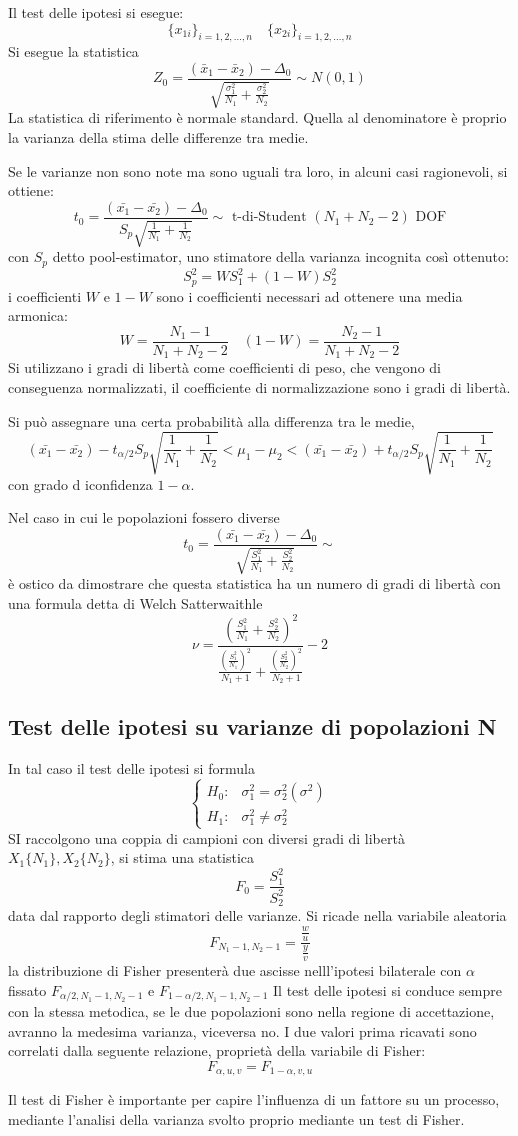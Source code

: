 Il test delle ipotesi si esegue:
$$
\{x_{1i}\}_{i=1,2,\ldots, n} \quad \{x_{2i}\}_{i=1,2,\ldots,n} 
$$
Si esegue la statistica
$$
Z_0 = \frac{(\bar{x}_1 - \bar{x}_2) -\Delta_0}{\sqrt{\frac{\sigma^2_1}{N_1}+\frac{\sigma_2^2}{N_2}}} \sim N(0,1)
$$
La statistica di riferimento è normale standard. Quella al denominatore è proprio la varianza della stima delle differenze tra medie.

Se le varianze non sono note ma sono uguali tra loro, in alcuni casi ragionevoli, si ottiene:
$$
t_0 = \frac{(\bar{x_1}-\bar{x_2})-\Delta_0}{S_p \sqrt{\frac{1}{N_1}+\frac{1}{N_2}}} \sim \text{ t-di-Student } (N_1+N_2-2) \text{ DOF}
$$
con $S_p$ detto pool-estimator, uno stimatore della varianza incognita così ottenuto:
$$
S_p^2 = WS_1^2 + (1-W)S_2^2
$$
i coefficienti $W$ e $1-W$ sono i coefficienti necessari ad ottenere una media armonica:
$$
W = \frac{N_1-1}{N_1+N_2-2} \quad (1-W) = \frac{N_2-1}{N_1+N_2-2}
$$
Si utilizzano i gradi di libertà come coefficienti di peso, che vengono di 
conseguenza normalizzati, il coefficiente di normalizzazione sono i gradi di 
libertà.

Si può assegnare una certa probabilità alla differenza tra le medie,
$$
(\bar{x_1}-\bar{x_2}) - t_{\alpha/2}S_p\sqrt{\frac{1}{N_1}+\frac{1}{N_2}} <
\mu_1-\mu_2 < (\bar{x_1}-\bar{x_2}) + t_{\alpha/2}S_p\sqrt{\frac{1}{N_1}+\frac{1}{N_2}}
$$
con grado d iconfidenza $1-\alpha$.

Nel caso in cui le popolazioni fossero diverse
$$
t_0 = \frac{(\bar{x_1}-\bar{x_2})-\Delta_0}{\sqrt{\frac{S_1^2}{N_1}+\frac{S_2^2}{N_2}}} \sim 
$$
è ostico da dimostrare che questa statistica ha un numero di gradi di libertà  con una formula detta di Welch Satterwaithle 
$$
\nu = \frac{\left(\frac{S_1^2}{N_1}+\frac{S_2^2}{N_2}\right)^2}
{\frac{\left(\frac{S_1^2}{N_1}\right)^2}{N_1+1} + \frac{\left(\frac{S_2^2}{N_2}\right)^2}{N_2+1}} -2
$$


\subsection{Test delle ipotesi su varianze di popolazioni N}
In tal caso il test delle ipotesi si formula
$$
\begin{cases}
    H_0: & \sigma^2_1 = \sigma^2_2 (\sigma^2)\\
    H_1: & \sigma^2_1 \neq \sigma^2_2 
\end{cases}
$$
SI raccolgono una coppia di campioni con diversi gradi di libertà $X_1\{N_1\}, X_2\{N_2\}$, si stima una statistica
$$
F_0 = \frac{S_1^2}{S_2^2} 
$$
data dal rapporto degli stimatori delle varianze.
Si ricade nella variabile aleatoria
$$
F_{N_1-1,N_2-1} = \frac{\frac{w}{u}}{\frac{y}{v}}
$$
la distribuzione di Fisher presenterà due ascisse nelll'ipotesi bilaterale con 
$\alpha$ fissato
$F_{\alpha/2,N_1-1,N_2-1} $ e $F_{1- \alpha/2,N_1-1,N_2-1}$
Il test delle ipotesi si conduce sempre con la stessa metodica, se le due popolazioni sono nella regione di accettazione, avranno la medesima varianza, viceversa no.
I due valori prima ricavati sono correlati dalla seguente relazione, proprietà della variabile di Fisher:
$$
F_{\alpha,u,v} = F_{1-\alpha,v,u}
$$

Il test di Fisher è importante per capire l'influenza di un fattore su un processo, mediante l'analisi della varianza svolto proprio mediante un test di Fisher.

